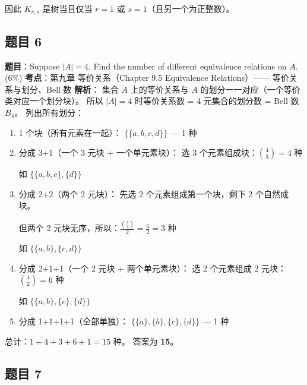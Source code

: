 \documentclass[10pt,a4paper,openany]{ctexbook}
\theoremstyle{definition}
\theoremstyle{remark}
\begin{document}
因此 $K_{r,s}$ 是树当且仅当 $r = 1$ 或 $s = 1$（且另一个为正整数）。
\vspace{-2pt}

\subsection{题目 6}

\textbf{题目}：Suppose $|A| = 4$. Find the number of different equivalence relations on $A$. (6\%)
\textbf{考点}：第九章 等价关系（Chapter 9.5 Equivalence Relations）—— 等价关系与划分、Bell 数
\textbf{解析}：
集合 $A$ 上的等价关系与 $A$ 的划分一一对应（一个等价类对应一个划分块）。
所以 $|A| = 4$ 时等价关系数 = 4 元集合的划分数 = Bell 数 $B_4$。
列出所有划分：
\begin{enumerate}
\item 1 个块（所有元素在一起）：
$\{\{a,b,c,d\}\}$ — 1 种


\item 分成 3+1（一个 3 元块 + 一个单元素块）：
选 3 个元素组成块：$\binom{4}{3} = 4$ 种

如 $\{\{a,b,c\}, \{d\}\}$


\item 分成 2+2（两个 2 元块）：
先选 2 个元素组成第一个块，剩下 2 个自然成块。

但两个 2 元块无序，所以：$\frac{\binom{4}{2}}{2} = \frac{6}{2} = 3$ 种

如 $\{\{a,b\}, \{c,d\}\}$


\item 分成 2+1+1（一个 2 元块 + 两个单元素块）：
选 2 个元素组成 2 元块：$\binom{4}{2} = 6$ 种

如 $\{\{a,b\}, \{c\}, \{d\}\}$


\item 分成 1+1+1+1（全部单独）：
$\{\{a\}, \{b\}, \{c\}, \{d\}\}$ — 1 种


\end{enumerate}

总计：$1 + 4 + 3 + 6 + 1 = 15$ 种。
答案为 \textbf{15}。
\vspace{-2pt}

\subsection{题目 7}
\end{document}
